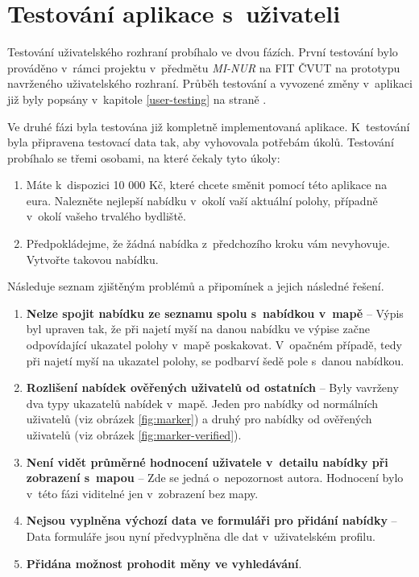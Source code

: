 \chapter{Testování aplikace s~uživateli}
\label{user-testing2}

Testování uživatelského rozhraní probíhalo ve dvou fázích. První testování bylo prováděno v~rámci projektu v~předmětu \textit{MI-NUR} na FIT ČVUT na prototypu navrženého uživatelského rozhraní. Průběh testování a vyvozené změny v~aplikaci již byly popsány v~kapitole \ref{user-testing} na straně \pageref{user-testing}.

Ve druhé fázi byla testována již kompletně implementovaná aplikace. K~testování byla připravena testovací data tak, aby vyhovovala potřebám úkolů. Testování probíhalo se třemi osobami, na které čekaly tyto úkoly:

\begin{enumerate}
    \item Máte k~dispozici 10 000 Kč, které chcete směnit pomocí této aplikace na eura. Nalezněte nejlepší nabídku v~okolí vaší aktuální polohy, případně v~okolí vašeho trvalého bydliště.
    \item Předpokládejme, že žádná nabídka z~předchozího kroku vám nevyhovuje. Vytvořte takovou nabídku.
\end{enumerate}

Následuje seznam zjištěným problémů a připomínek a jejich následné řešení.

\begin{enumerate}
    \item \textbf{Nelze spojit nabídku ze seznamu spolu s~nabídkou v~mapě} -- Výpis byl upraven tak, že při najetí myší na danou nabídku ve výpise začne odpovídající ukazatel polohy v~mapě poskakovat. V~opačném případě, tedy při najetí myší na ukazatel polohy, se podbarví šedě pole s~danou nabídkou.
    \item \textbf{Rozlišení nabídek ověřených uživatelů od ostatních} -- Byly vavrženy dva typy ukazatelů nabídek v~mapě. Jeden pro nabídky od normálních uživatelů (viz obrázek \ref{fig:marker}) a druhý pro nabídky od ověřených uživatelů (viz obrázek \ref{fig:marker-verified}).
    \item \textbf{Není vidět průměrné hodnocení uživatele v~detailu nabídky při zobrazení s~mapou} -- Zde se jedná o~nepozornost autora. Hodnocení bylo v~této fázi viditelné jen v~zobrazení bez mapy.
    \item \textbf{Nejsou vyplněna výchozí data ve formuláři pro přidání nabídky} -- Data formuláře jsou nyní předvyplněna dle dat v~uživatelském profilu.
    \item \textbf{Přidána možnost prohodit měny ve vyhledávání}.
\end{enumerate}

